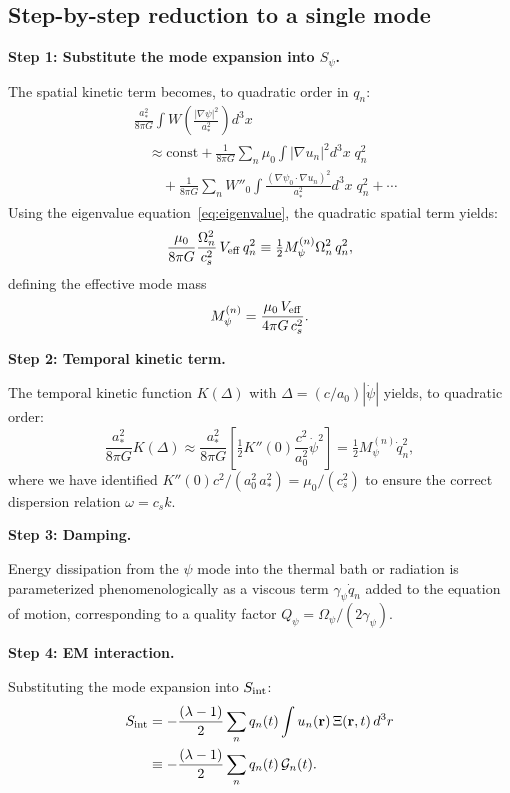 \documentclass[12pt,aps,prd,twocolumn,superscriptaddress,nofootinbib]{revtex4-2}
\newcommand{\Opsi}{\Omega_\psi}
\newcommand{\gpsi}{\gamma_\psi}
\newcommand{\Mpsi}{M_\psi}
\newcommand{\half}{\tfrac{1}{2}}
\newcommand{\br}{\mathbf{r}}
\begin{document}
\subsection{Step-by-step reduction to a single mode}

\textbf{Step 1: Substitute the mode expansion into $S_\psi$.}

The spatial kinetic term becomes, to quadratic order in $q_n$:
\begin{align}
&\frac{a_*^2}{8\pi G}\int W\!\left(\frac{|\nabla\psi|^2}{a_*^2}\right)d^3x
\nonumber\\
&\quad \approx \text{const} + \frac{1}{8\pi G}\sum_n
\mu_0\int|\nabla u_n|^2 d^3x\;q_n^2
\nonumber\\
&\quad\quad + \frac{1}{8\pi G}\sum_n
W''_0\int\frac{(\nabla\psi_0\cdot\nabla u_n)^2}{a_*^2}d^3x\;q_n^2
+ \cdots
\label{eq:spatial_expand}
\end{align}
Using the eigenvalue equation~\eqref{eq:eigenvalue}, the quadratic
spatial term yields:
\begin{equation}
\frac{\mu_0}{8\pi G}\frac{\Omega_n^2}{c_s^2}\,V_{\rm eff}\,q_n^2
\equiv \half\Mpsi^{(n)}\Omega_n^2\,q_n^2,
\label{eq:effective_mass_def}
\end{equation}
defining the effective mode mass
\begin{equation}
\Mpsi^{(n)} = \frac{\mu_0\,V_{\rm eff}}{4\pi G\,c_s^2}.
\label{eq:Mpsi}
\end{equation}

\textbf{Step 2: Temporal kinetic term.}

The temporal kinetic function $K(\Delta)$ with $\Delta = (c/a_0)|\dot\psi|$
yields, to quadratic order:
\begin{equation}
\frac{a_*^2}{8\pi G}K(\Delta) \approx
\frac{a_*^2}{8\pi G}\left[\half K''(0)\frac{c^2}{a_0^2}\dot\psi^2\right]
= \half\Mpsi^{(n)}\dot{q}_n^2,
\label{eq:temporal_expand}
\end{equation}
where we have identified $K''(0)c^2/(a_0^2\,a_*^2) = \mu_0/(c_s^2)$
to ensure the correct dispersion relation $\omega = c_s k$.

\textbf{Step 3: Damping.}

Energy dissipation from the $\psi$ mode into the thermal bath or
radiation is parameterized phenomenologically as a viscous term
$\gpsi\dot{q}_n$ added to the equation of motion, corresponding to
a quality factor $Q_\psi = \Opsi/(2\gpsi)$.

\textbf{Step 4: EM interaction.}

Substituting the mode expansion into $S_{\rm int}$:
\begin{align}
S_{\rm int} &= -\frac{(\lambda-1)}{2}\sum_n q_n(t)
\int u_n(\br)\,\Xi(\br,t)\,d^3r
\nonumber\\
&\equiv -\frac{(\lambda-1)}{2}\sum_n q_n(t)\,\mathcal{G}_n(t).
\label{eq:int_expanded}
\end{align}
\end{document}

